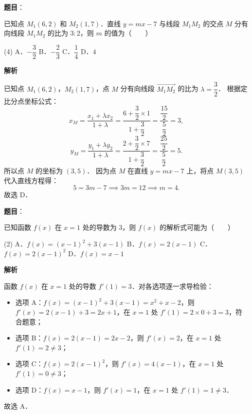 \begin{answer}

\textbf{题目}：

已知点 $M_1(6, 2)$ 和 $M_2(1, 7)$．直线 $y = mx - 7$ 与线段 $M_1M_2$ 的交点 $M$ 分有向线段 $M_1M_2$ 的比为 $3 : 2$，则 $m$ 的值为\mbox{（　　）}

\begin{gkopts}(4)
\task A．$-\dfrac{3}{2}$
\task B．$-\dfrac{2}{3}$
\task C．$\dfrac{1}{4}$
\task D．$4$
\end{gkopts}

\textbf{解析}

已知点 $M_1(6, 2)$，$M_2(1, 7)$，点 $M$ 分有向线段 $\overrightarrow{M_1M_2}$ 的比为 $\lambda = \dfrac{3}{2}$．
根据定比分点坐标公式：
\nopagebreak[4]
\[
x_M = \frac{x_1 + \lambda x_2}{1 + \lambda} = \frac{6 + \dfrac{3}{2} \times 1}{1 + \dfrac{3}{2}} = \frac{\dfrac{15}{2}}{\dfrac{5}{2}} = 3,
\]
\nopagebreak[4]
\[
y_M = \frac{y_1 + \lambda y_2}{1 + \lambda} = \frac{2 + \dfrac{3}{2} \times 7}{1 + \dfrac{3}{2}} = \frac{\dfrac{25}{2}}{\dfrac{5}{2}} = 5.
\]
所以点 $M$ 的坐标为 $(3, 5)$．
因为点 $M$ 在直线 $y = mx - 7$ 上，将点 $M(3, 5)$ 代入直线方程得：
\nopagebreak[4]
\[
5 = 3m - 7 \implies 3m = 12 \implies m = 4.
\]
故选 D．


\end{answer}
\begin{answer}

\textbf{题目}：

已知函数 $f(x)$ 在 $x = 1$ 处的导数为 $3$，则 $f(x)$ 的解析式可能为\mbox{（　　）}

\begin{gkopts}(2)
\task A．$f(x) = (x - 1)^2 + 3(x - 1)$
\task B．$f(x) = 2(x - 1)$
\task C．$f(x) = 2(x - 1)^2$
\task D．$f(x) = x - 1$
\end{gkopts}

\textbf{解析}

函数 $f(x)$ 在 $x = 1$ 处的导数 $f'(1) = 3$．对各选项逐一求导检验：
\begin{itemize}
\item 选项 A：$f(x) = (x - 1)^2 + 3(x - 1) = x^2 + x - 2$，则 $f'(x) = 2(x - 1) + 3 = 2x + 1$，在 $x = 1$ 处 $f'(1) = 2 \times 0 + 3 = 3$，符合题意；
\item 选项 B：$f(x) = 2(x - 1) = 2x - 2$，则 $f'(x) = 2$，在 $x = 1$ 处 $f'(1) = 2 \neq 3$；
\item 选项 C：$f(x) = 2(x - 1)^2$，则 $f'(x) = 4(x - 1)$，在 $x = 1$ 处 $f'(1) = 0 \neq 3$；
\item 选项 D：$f(x) = x - 1$，则 $f'(x) = 1$，在 $x = 1$ 处 $f'(1) = 1 \neq 3$．
\end{itemize}

故选 A．


\end{answer}
